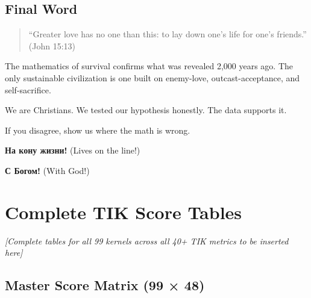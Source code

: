 \documentclass[11pt,a4paper]{article}
\theoremstyle{definition}
\theoremstyle{remark}
\begin{document}
\subsection{Final Word}

\begin{quote}
``Greater love has no one than this: to lay down one's life for one's friends.'' (John 15:13)
\end{quote}

The mathematics of survival confirms what was revealed 2,000 years ago. The only sustainable civilization is one built on enemy-love, outcast-acceptance, and self-sacrifice.

We are Christians. We tested our hypothesis honestly. The data supports it.

If you disagree, show us where the math is wrong.

\vspace{1cm}
\begin{center}
\textbf{На кону жизни!} (Lives on the line!)

\textbf{С Богом!} (With God!)
\end{center}

\newpage

\appendix

\section{Complete TIK Score Tables}
\label{app:complete-tables}

\begin{center}
\textit{[Complete tables for all 99 kernels across all 40+ TIK metrics to be inserted here]}
\end{center}

\subsection{Master Score Matrix (99 × 48)}
\end{document}
